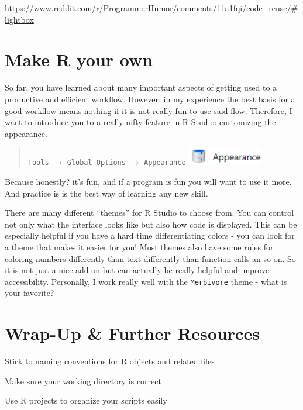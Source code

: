\documentclass[
]{book}
\begin{document}
\url{https://www.reddit.com/r/ProgrammerHumor/comments/11a1fqi/code_reuse/\#lightbox}

\section{Make R your own}\label{make-r-your-own}

So far, you have learned about many important aspects of getting used to a productive and efficient workflow.
However, in my experience the best basis for a good workflow means nothing if it is not really fun to use said flow.
Therefore, I want to introduce you to a really nifty feature in R Studio: customizing the appearance.

\begin{quote}
\texttt{Tools} \(\rightarrow\) \texttt{Global\ Options} \(\rightarrow\) \texttt{Appearance} \includegraphics[width=\textwidth,height=0.3125in]{./img/appearance.png}
\end{quote}

Because honestly? it's fun, and if a program is fun you will want to use it more.
And practice is is the best way of learning any new skill.

There are many different ``themes'' for R Studio to choose from.
You can control not only what the interface looks like but also how code is displayed.
This can be especially helpful if you have a hard time differentiating colors - you can look for a theme that makes it easier for you!
Most themes also have some rules for coloring numbers differently than text differently than function calls an so on.
So it is not just a nice add on but can actually be really helpful and improve accessibility.
Personally, I work really well with the \texttt{Merbivore} theme - what is your favorite?

\section*{Wrap-Up \& Further Resources}\label{wrap-up-further-resources-2}

Stick to naming conventions for R objects and related files

Make sure your working directory is correct

Use R projects to organize your scripts easily
\end{document}
